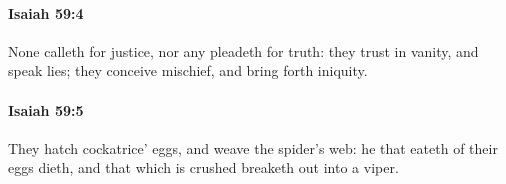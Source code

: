 		\paragraph{Isaiah 59:4} %
			\label{ISAIAH-59-4}

			None calleth for justice, nor any pleadeth for truth: they trust in vanity, and speak lies; they conceive mischief, and bring forth iniquity.


		\paragraph{Isaiah 59:5} %
			\label{ISAIAH-59-5}

			They hatch cockatrice' eggs, and weave the spider's web: he that eateth of their eggs dieth, and that which is crushed breaketh out into a viper.


